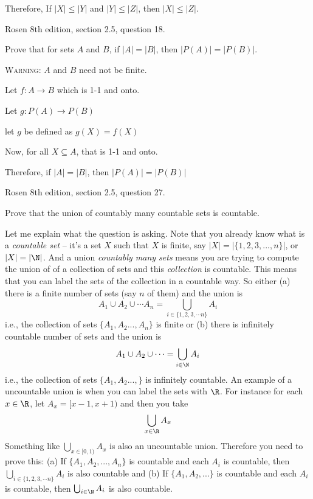 Therefore, If $|X| \leq |Y|$ and $|Y| \leq |Z|$, then $|X| \leq |Z|$.







\newpage
\nextq Rosen 8th edition, section 2.5, question 18.

Prove that for sets $A$ and $B$, if $|A| = |B|$, then $|P(A)| = |P(B)|$.

\textsc{Warning:} $A$ and $B$ need not be finite.

\SOLUTION

Let $f: A \rightarrow B$ which is 1-1 and onto. 

Let $g: P(A) \rightarrow P(B)$

let $g$ be defined as $g(X) = f(X)$ 

Now, for all $X \subseteq A$, that is 1-1 and onto.

Therefore, if $|A| = |B|$, then $|P(A)| = |P(B)|$



\newpage
\nextq Rosen 8th edition, section 2.5, question 27.

Prove that the union of countably many countable sets is countable.
      
Let me explain what the question is asking.
Note that you already know what
is a \textit{countable set} -- it's a set $X$ such that $X$ is finite, say
$|X| = |\{1, 2, 3, ..., n\}|$, or $|X| = |\N|$.
And a union \textit{countably many sets} means you are trying to
compute the union of of a collection of sets and this \textit{collection} is
countable.
This means that you can label the sets of the collection in a countable way.
So either
(a) there is a finite number of sets (say $n$ of them) and the union is
\[
A_1 \cup A_2 \cup \cdots A_n = \bigcup_{i \in \{1, 2, 3, \cdots n\}} A_i
\]
i.e., the collection of sets $\{A_1, A_2 ..., A_n\}$ is finite
or
(b) there is infinitely countable number of sets and the union is
\[
A_1 \cup A_2 \cup \cdots = \bigcup_{i \in \N} A_i
\]
i.e., the collection of sets $\{A_1, A_2 ..., \}$ is infinitely countable.
An example of a uncountable union is when you can label the sets with $\R$.
For instance for each $x \in \R$, let $A_x = [x-1, x+1)$ and then you take
\[
\bigcup_{x \in \R} A_x
\]
Something like $\bigcup_{x \in [0,1)} A_x$ is also an uncountable union.
Therefore you need to prove this:
(a) If $\{A_1, A_2, ..., A_n\}$ is countable and each $A_i$ is countable, then
$\bigcup_{i \in \{1, 2, 3, \cdots n\}} A_i$ is also countable and
(b) If $\{A_1, A_2, ...\}$ is countable and each $A_i$ is countable, then
$\bigcup_{i \in \N} A_i$ is also countable.

